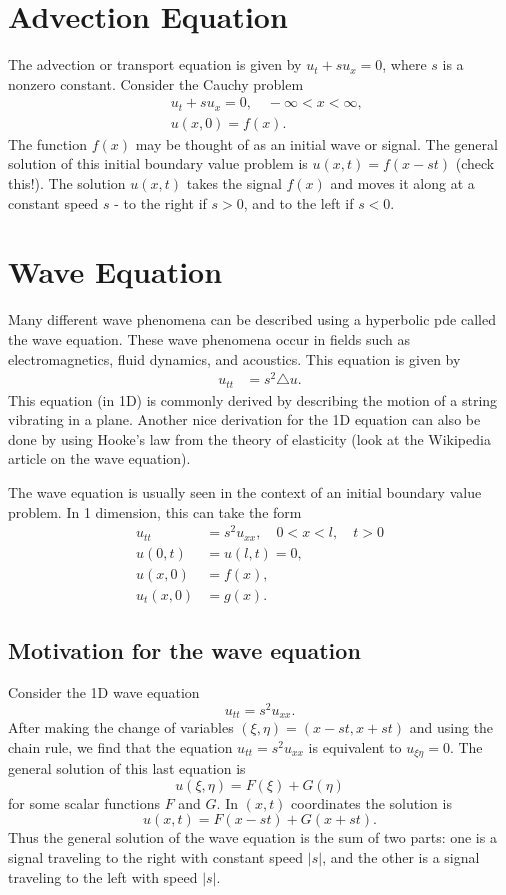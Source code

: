\label{lab:waveeqn}


\section{Advection Equation}
The advection or transport equation is given by $u_t + s u_x = 0$, where $s$ is a nonzero constant.  
Consider the Cauchy problem 
\begin{align*}
	& u_t + su_x = 0, \quad -\infty < x < \infty,\\\
	& u(x,0) = f(x).
\end{align*}
The function $f(x)$ may be thought of as an initial wave or signal. The general solution of this initial boundary value problem is $u(x,t) = f(x-st)$ (check this!). The solution $u(x,t)$ takes the signal $f(x)$ and moves it along at a constant speed $s$ - to the right if $s > 0$, and to the left if $s < 0$. 

\section{Wave Equation}
Many different wave phenomena can be described using a hyperbolic pde called the wave equation. 
These wave phenomena occur in fields such as electromagnetics, fluid dynamics, and acoustics. 
This equation is given by 
\begin{align}
	u_{tt} &= s^2 \triangle u.
\end{align}
This equation (in 1D) is commonly derived by describing the motion of a string vibrating in a plane. Another nice derivation for the 1D equation can also be done by using Hooke's law from the theory of elasticity (look at the Wikipedia article on the wave equation).

The wave equation is usually seen in the context of an initial boundary value problem. 
In 1 dimension, this can take the form 
\begin{align*}
	u_{tt} &= s^2 u_{xx}, \quad 0 < x < l, \quad t > 0\\
	u(0,t) &= u(l,t) = 0, \\
	u(x,0) &= f(x),\\ 
	u_t(x,0) &= g(x).
\end{align*}

\subsection{Motivation for the wave equation}
Consider the 1D wave equation 
\[u_{tt} = s^2 u_{xx}.\]
After making the change of variables $(\xi,\eta) = (x-st, x + st)$ and using the chain rule, we find that the equation $u_{tt} = s^2 u_{xx}$ is equivalent to $u_{\xi \eta} = 0$. The general solution of this last equation is 
\[ u(\xi, \eta) = F(\xi) + G(\eta) \]
for some scalar functions $F$ and $G$. In $(x,t)$ coordinates the solution is 
\[u(x,t) = F(x-st) + G(x+st).\]
Thus the general solution of the wave equation is the sum of two parts: one is a signal traveling to the right with constant speed $|s|$, and the other is a signal traveling to the left with speed $|s|$.

